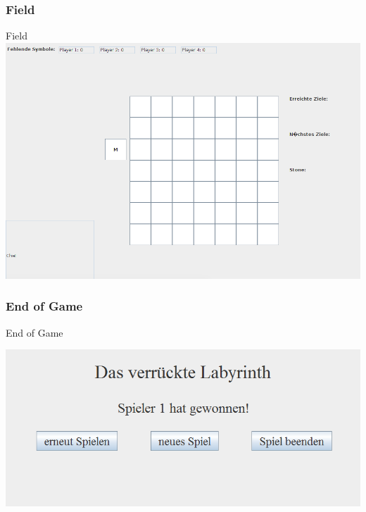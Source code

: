 \documentclass{beamer}
\begin{document}
		    \label{Frame6}	
			\begin{frame}
				\frametitle{Field}
				\begin{block}{Field}
					\includegraphics[scale=0.27]{Bilder/bild3.png}
				\end{block}		
			\end{frame}
		
			\label{Frame7}	
			\begin{frame}
				\frametitle{End of Game}
				\begin{block}{End of Game}
					\begin{center}
						\includegraphics[scale=0.57]{Bilder/bild6.png}
					\end{center}
					
				\end{block}		
			\end{frame}		
			
				
\end{document}
